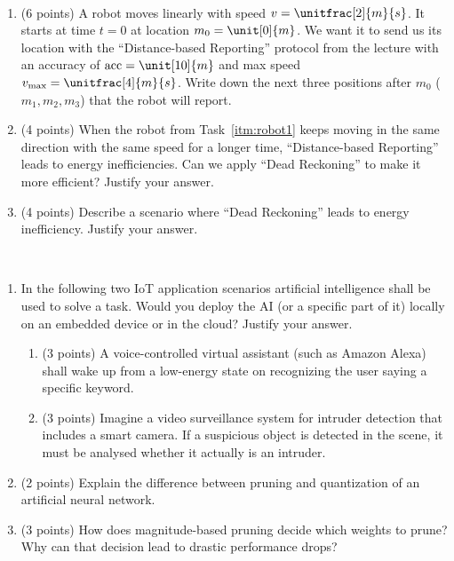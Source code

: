\documentclass[12pt]{article}
\begin{document}
    \newpage

    \begin{ejercicio}[14 points]
        ~
        \begin{enumerate}[label=\alph*)]
            \item\label{itm:robot1}
                (6 points) A robot moves linearly with speed $v = \unitfrac[2]{m}{s}$. It starts at time $t = 0$ at location $m_0 = \unit[0]{m}$. We want it to send us its location with the ``Distance-based Reporting'' protocol from the lecture with an accuracy of $\text{acc} = \unit[10]{m}$ and max speed $v_{\max} = \unitfrac[4]{m}{s}$. Write down the next three positions after $m_0$ ($m_1, m_2, m_3$) that the robot will report.
            \item (4 points) When the robot from Task~\ref{itm:robot1} keeps moving in the same direction with the same speed for a longer time, ``Distance-based Reporting'' leads to energy inefficiencies. Can we apply ``Dead Reckoning'' to make it more efficient? Justify your answer.
            \item (4 points) Describe a scenario where ``Dead Reckoning'' leads to energy inefficiency. Justify your answer.
        \end{enumerate}
    \end{ejercicio}

    \newpage

    \begin{ejercicio}[11 points]
        ~
        \begin{enumerate}[label=\alph*)]
            \item In the following two IoT application scenarios artificial intelligence shall be used to solve a task. Would you deploy the AI (or a specific part of it) locally on an embedded device or in the cloud? Justify your answer.
            \begin{enumerate}[label=\roman*)]
                \item (3 points) A voice-controlled virtual assistant (such as Amazon Alexa) shall wake up from a low-energy state on recognizing the user saying a specific keyword.
                \item (3 points) Imagine a video surveillance system for intruder detection that includes a smart camera. If a suspicious object is detected in the scene, it must be analysed whether it actually is an intruder.
            \end{enumerate}
            \item (2 points) Explain the difference between pruning and quantization of an artificial neural network.
            \item (3 points) How does magnitude-based pruning decide which weights to prune? Why can that decision lead to drastic performance drops?
        \end{enumerate}
    \end{ejercicio}
\end{document}
